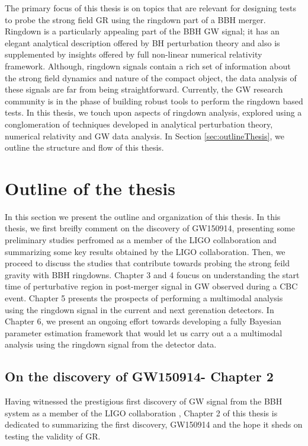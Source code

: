The primary focus of this thesis is on topics that are relevant for designing tests to probe the strong field GR using the ringdown part of a BBH merger. Ringdown is a particularly appealing part of the BBH GW signal; it has an elegant analytical description offered by BH  perturbation theory and also is supplemented by insights offered by full non-linear numerical relativity framework. Although, ringdown signals contain a rich set of information about the strong field dynamics and nature of the compact object, the data analysis of these signals are far from being straightforward. Currently, the GW research community is in the phase of building robust tools to perform the ringdown based tests. In this thesis, we touch upon aspects of ringdown analysis, explored using a conglomeration of techniques developed in analytical perturbation theory, numerical relativity and GW data analysis. In Section \ref{sec:outlineThesis}, we outline the structure and flow of this thesis.


\section{Outline of the thesis}
\label{sec:outlineOfThesis}
In this section we present the outline and organization of this thesis. In this thesis, we first breifly comment on the discovery of GW150914, presenting some preliminary studies perfromed as a member of the LIGO collaboration and summarizing some key results obtained by the LIGO collaboration. Then, we proceed to discuss the studies that contribute towards probing the strong feild gravity with BBH ringdowns. Chapter 3 and 4 foucus on understanding the start time of perturbative region in post-merger signal in GW observed during a CBC event. Chapter 5 presents the prospects of performing a multimodal analysis using the ringdown signal in the current and next gerenation detectors. In Chapter 6, we present an ongoing effort towards developing a fully Bayesian parameter estimation framework that would let us carry out a a multimodal analysis using the ringdown signal from the detector data.

\subsection{On the discovery of GW150914- Chapter 2}
Having witnessed the prestigious first discovery of GW signal from the BBH system as a member of the LIGO collaboration , Chapter 2 of this thesis is dedicated to summarizing the first discovery, GW150914 and the hope it sheds on testing the validity of GR. 

